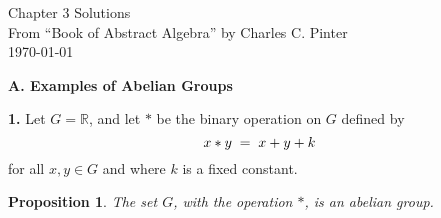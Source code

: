 \documentclass[12pt]{article}   %
\newtheorem*{proposition}{Proposition}  %
\begin{document}
\begin{center}
Chapter 3 Solutions \\
From ``Book of Abstract Algebra'' by Charles C. Pinter \\
\today
\end{center}


\bigskip  %

\noindent\textbf{A. Examples of Abelian Groups} \smallskip

\noindent\textbf{1.} \quad Let $G = \mathbb{R}$, and let $\ast$ be the binary operation on $G$ defined by
\[
x \ast y  \;=\; x + y + k \\
\]
for all $x , y \in G$ and where $k$ is a fixed constant.

\begin{proposition}
The set $G$, with the operation $\ast$, is an abelian group.
\end{proposition}
\end{document}

